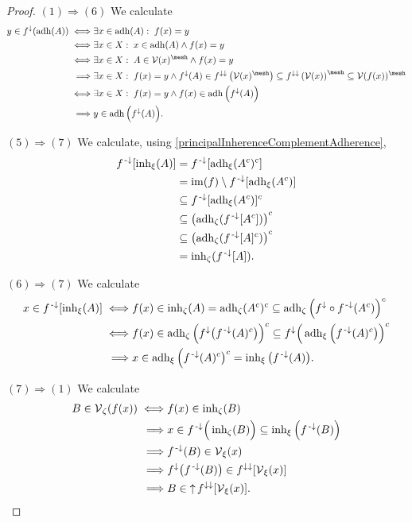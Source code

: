 \begin{proof}
$(1) \Rightarrow (6)$ We calculate
\begin{align*}
y\in f^\imf(\adh(A)) \iff& \exists x\in \adh(A):\;f(x) = y\\
\iff& \exists x\in X: \; x\in \adh(A) \land f(x) = y\\
\iff& \exists x\in X: \; A\in\vicinity(x)^{\mesh}  \land f(x) = y \\
\implies& \exists x\in X: \; f(x) = y \land f^\imf(A)\in f^{\imf\imf}\left(\vicinity(x)^{\mesh}\right) \subseteq f^{\imf\imf}\left(\vicinity(x)\right)^{\mesh} \subseteq \vicinity(f(x))^{\mesh} \\
\iff& \exists x\in X: \; f(x) = y \land f(x)\in \adh\Big(f^\imf(A)\Big) \\
\implies& y\in \adh\Big(f^\imf(A)\Big).
\end{align*}

$(5) \Rightarrow (7)$ We calculate, using \ref{principalInherenceComplementAdherence},
\begin{align*}
f^{\text{\hspace{0.15em}-}\downarrow}[\operatorname{inh}_\xi(A)] &= f^{\text{\hspace{0.15em}-}\downarrow}[\operatorname{adh}_\xi(A^c)^c] \\
&= \operatorname{im}(f)\setminus f^{{\text{\hspace{0.15em}-}\downarrow}}[\operatorname{adh}_\xi(A^c)] \\
&\subseteq f^{{\text{\hspace{0.15em}-}\downarrow}}[\operatorname{adh}_\xi(A^c)]^c \\
&\subseteq \left(\operatorname{adh}_\zeta(f^{{\text{\hspace{0.15em}-}\downarrow}}[A^c])\right)^c \\
&\subseteq \left(\operatorname{adh}_\zeta(f^{{\text{\hspace{0.15em}-}\downarrow}}[A]^c)\right)^c \\
&= \operatorname{inh}_\zeta(f^{{\text{\hspace{0.15em}-}\downarrow}}[A]).
\end{align*}

$(6) \Rightarrow (7)$ We calculate
\begin{align*}
x\in f^{\text{\hspace{0.15em}-}\downarrow}[\operatorname{inh}_\xi(A)] \iff& f(x) \in \operatorname{inh}_\zeta(A) = \operatorname{adh}_\zeta(A^c)^c \subseteq \operatorname{adh}_\zeta\Big(f^\downarrow\circ f^{{\text{\hspace{0.15em}-}\downarrow}}(A^c)\Big)^c \\
\iff& f(x) \in \operatorname{adh}_\zeta\Big(f^\downarrow\big(f^{{\text{\hspace{0.15em}-}\downarrow}}(A)^c\big)\Big)^c \subseteq f^\downarrow\Big(\operatorname{adh}_\xi\Big(f^{{\text{\hspace{0.15em}-}\downarrow}}(A)^c\big)\Big)^c \\
\implies& x\in \operatorname{adh}_\xi\Big(f^{{\text{\hspace{0.15em}-}\downarrow}}(A)^c\big)^c = \operatorname{inh}_\xi\big(f^{{\text{\hspace{0.15em}-}\downarrow}}(A)\big).
\end{align*}

$(7) \Rightarrow (1)$ We calculate
\begin{align*}
B\in \operatorname{\mathcal{V}}_\zeta(f(x)) \iff& f(x) \in \operatorname{inh}_\zeta(B) \\
\implies& x\in f^{{\text{\hspace{0.15em}-}\downarrow}}\Big(\operatorname{inh}_\zeta(B)\Big) \subseteq \operatorname{inh}_\xi\Big(f^{\text{\hspace{0.15em}-}\downarrow}(B)\Big) \\
\implies& f^{\text{\hspace{0.15em}-}\downarrow}(B) \in \operatorname{\mathcal{V}}_\xi(x) \\
\implies& f^\downarrow\big(f^{\text{\hspace{0.15em}-}\downarrow}(B)\big) \in f^{\downarrow\downarrow}[\operatorname{\mathcal{V}}_\xi(x)] \\
\implies& B \in \operatorname{\uparrow} f^{\downarrow\downarrow}[\operatorname{\mathcal{V}}_\xi(x)].
\end{align*}
\end{proof}
